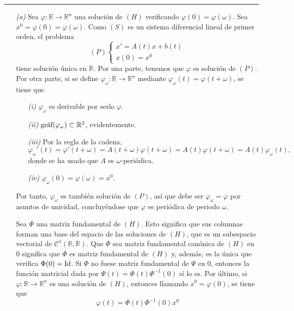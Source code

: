 \documentclass[11pt]{report}
\newcommand{\R}{\mathbb R}
\begin{document}
\hrule

\vspace{2mm}

\begin{itemize}
    \item[\textit{(a)}] Sea $\varphi \colon \R \to \R^n$ una solución de $(H)$ verificando $\varphi(0)=\varphi(\omega)$. Sea $x^0=\varphi(0)=\varphi(\omega)$. Como $(S)$ es un sistema diferencial lineal de primer orden, el problema
    \[(P) \begin{cases}
        x'=A(t)x+b(t) \\
        x(0)=x^0
    \end{cases}\]
    tiene solución única en $\R$. Por una parte, tenemos que $\varphi$ es solución de $(P)$. Por otra parte, si se define $\varphi_\omega \colon \R \to \R^n$ mediante $\varphi_\omega(t) = \varphi(t+\omega)$, se tiene que
    \begin{itemize}
        \item[\textit{(i)}] $\varphi_\omega$ es derivable por serlo $\varphi$.
        \item[\textit{(ii)}] $\textup{gráf}(\varphi_{\omega}) \subset \R^2$, evidentemente.
        \item[\textit{(iii)}] Por la regla de la cadena, \[\varphi_\omega'(t) = \varphi'(t+\omega)=A(t+\omega)\varphi(t+\omega)=A(t)\varphi(t+\omega)=A(t)\varphi_\omega(t),\] donde se ha usado que $A$ es $\omega$-periódica.
        \item[\textit{(iv)}] $\varphi_\omega(0) = \varphi(\omega)=x^0$.
    \end{itemize}
    Por tanto, $\varphi_\omega$ es también solución de $(P)$, así que debe ser $\varphi_\omega = \varphi$ por asuntos de unicidad, concluyéndose que $\varphi$ es periódica de periodo $\omega$.

    \vspace{2mm}

Sea $\Phi$ una matriz fundamental de $(H)$. Esto significa que sus columnas forman una base del espacio de las soluciones de $(H)$, que es un subespacio vectorial de $\mathcal{C}^1(\R,\R)$. Que $\Phi$ sea matriz fundamental canónica de $(H)$ en 0 significa que $\Phi$ es matriz fundamental de $(H)$ y, además, es la única que verifica $\Phi(0)=\textup{Id}$. Si $\Phi$ no fuese matriz fundamental de $\Psi$ en 0, entonces la función matricial dada por $\Psi(t)=\Phi(t)\Phi^{-1}(0)$ sí lo es. Por último, si $\varphi \colon \R \to \R^n$ es una solución de $(H)$, entonces llamando $x^0=\varphi(0)$, se tiene que
\[\varphi(t)=\Phi(t)\Phi^{-1}(0)x^0\]


\end{itemize}
\end{document}
